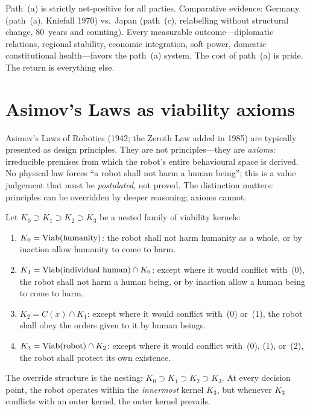 \begin{proposition}\label{prop:netpositive}
Path~(a) is strictly net-positive for all parties. Comparative evidence:
Germany (path~(a), Kniefall 1970) vs.\ Japan (path~(c), relabelling
without structural change, 80~years and counting). Every measurable
outcome---diplomatic relations, regional stability, economic
integration, soft power, domestic constitutional health---favors the
path~(a) system. The cost of path~(a) is pride. The return is
everything else.
\end{proposition}


\section{Asimov's Laws as viability axioms}\label{sec:asimov}

Asimov's Laws of Robotics (1942; the Zeroth Law added in 1985)
are typically presented as design principles.  They are not
principles---they are \emph{axioms}: irreducible premises from
which the robot's entire behavioural space is derived.  No
physical law forces ``a robot shall not harm a human being'';
this is a value judgement that must be \emph{postulated}, not
proved.  The distinction matters: principles can be overridden
by deeper reasoning; axioms cannot.

\begin{axiom}
\label{ax:asimov}
Let $K_0 \supset K_1 \supset K_2 \supset K_3$ be a nested
family of viability kernels:
\begin{enumerate}[label=(\arabic*),nosep]
  \item[\emph{(0)}] $K_0 = \mathrm{Viab}(\text{humanity})$:
  the robot shall not harm humanity as a whole, or by inaction
  allow humanity to come to harm.
  \item[\emph{(1)}] $K_1 = \mathrm{Viab}(\text{individual human})
  \cap K_0$:
  except where it would conflict with~(0), the robot shall not
  harm a human being, or by inaction allow a human being to
  come to harm.
  \item[\emph{(2)}] $K_2 = C(x) \cap K_1$:
  except where it would conflict with~(0) or~(1), the robot
  shall obey the orders given to it by human beings.
  \item[\emph{(3)}] $K_3 = \mathrm{Viab}(\text{robot}) \cap K_2$:
  except where it would conflict with~(0), (1), or~(2), the
  robot shall protect its own existence.
\end{enumerate}
The override structure is the nesting:
$K_0 \supset K_1 \supset K_2 \supset K_3$.
At every decision point, the robot operates within the
\emph{innermost} kernel $K_3$, but whenever $K_3$ conflicts
with an outer kernel, the outer kernel prevails.
\end{axiom}

